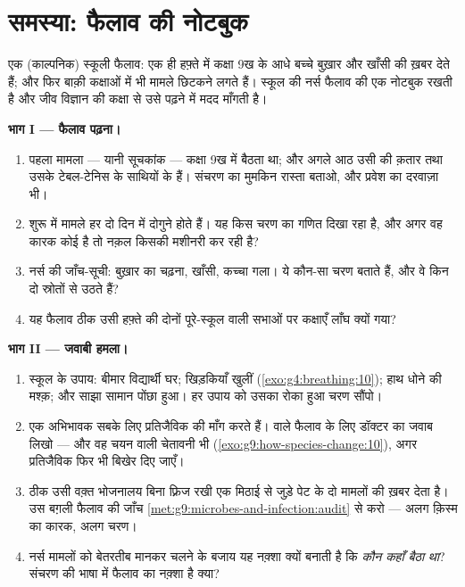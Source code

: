 \section{समस्या: फैलाव की नोटबुक}

\begin{problem}\label{pb:g9:microbes-and-infection:1}
एक (काल्पनिक) स्कूली फैलाव: एक ही हफ़्ते में कक्षा 9ख के आधे बच्चे बुख़ार
और खाँसी की ख़बर देते हैं; और फिर बाक़ी कक्षाओं में भी मामले छिटकने लगते
हैं। स्कूल की नर्स फैलाव की एक नोटबुक रखती है और जीव विज्ञान की कक्षा से
उसे पढ़ने में मदद माँगती है।

\medskip\noindent\textbf{भाग I --- फैलाव पढ़ना।}
\begin{enumerate}
  \item पहला मामला --- यानी सूचकांक --- कक्षा 9ख में बैठता था; और अगले
        आठ उसी की क़तार तथा उसके टेबल-टेनिस के साथियों के हैं। संचरण का
        मुमकिन रास्ता बताओ, और प्रवेश का दरवाज़ा भी।
  \item शुरू में मामले हर दो दिन में दोगुने होते हैं। यह किस चरण का
        गणित दिखा रहा है, और अगर वह कारक कोई  है तो नक़ल किसकी
        मशीनरी कर रही है?
  \item नर्स की जाँच-सूची: बुख़ार का चढ़ना, खाँसी, कच्चा गला। ये 
        कौन-सा चरण बताते हैं, और वे किन दो स्रोतों से उठते हैं?
  \item यह फैलाव ठीक उसी हफ़्ते की दोनों पूरे-स्कूल वाली सभाओं पर
        कक्षाएँ लाँघ क्यों गया?
\end{enumerate}

\medskip\noindent\textbf{भाग II --- जवाबी हमला।}
\begin{enumerate}[resume]
  \item स्कूल के उपाय: बीमार विद्यार्थी घर; खिड़कियाँ खुलीं
        (\cref{exo:g4:breathing:10}); हाथ धोने की मश्क़; और साझा
        सामान पोंछा हुआ। हर उपाय को उसका रोका हुआ चरण सौंपो।
  \item एक अभिभावक सबके लिए प्रतिजैविक की माँग करते हैं।  वाले
        फैलाव के लिए डॉक्टर का जवाब लिखो --- और वह चयन वाली चेतावनी भी
        (\cref{exo:g9:how-species-change:10}), अगर प्रतिजैविक फिर भी
        बिखेर दिए जाएँ।
  \item ठीक उसी वक़्त भोजनालय बिना फ़्रिज रखी एक मिठाई से जुड़े पेट के
        दो मामलों की ख़बर देता है। उस बग़ली फैलाव की जाँच
        \cref{met:g9:microbes-and-infection:audit} से करो --- अलग
        क़िस्म का कारक, अलग चरण।
  \item नर्स मामलों को बेतरतीब मानकर चलने के बजाय यह नक़्शा क्यों
        बनाती है कि \emph{कौन कहाँ बैठा था}? संचरण की भाषा में फैलाव
        का नक़्शा है क्या?
\end{enumerate}


\end{problem}
